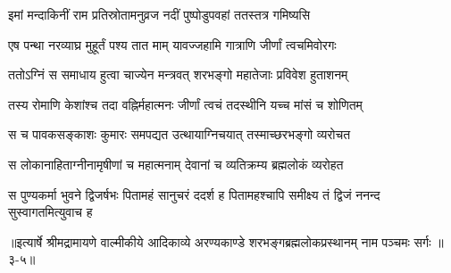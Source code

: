 \twolineshloka
{इमां मन्दाकिनीं राम प्रतिस्रोतामनुव्रज}
{नदीं पुष्पोडुपवहां ततस्तत्र गमिष्यसि} %

\twolineshloka
{एष पन्था नरव्याघ्र मुहूर्तं पश्य तात माम्}
{यावज्जहामि गात्राणि जीर्णां त्वचमिवोरगः} %

\twolineshloka
{ततोऽग्निं स समाधाय हुत्वा चाज्येन मन्त्रवत्}
{शरभङ्गो महातेजाः प्रविवेश हुताशनम्} %

\twolineshloka
{तस्य रोमाणि केशांश्च तदा वह्निर्महात्मनः}
{जीर्णां त्वचं तदस्थीनि यच्च मांसं च शोणितम्} %

\twolineshloka
{स च पावकसङ्काशः कुमारः समपद्यत}
{उत्थायाग्निचयात् तस्माच्छरभङ्गो व्यरोचत} %

\twolineshloka
{स लोकानाहिताग्नीनामृषीणां च महात्मनाम्}
{देवानां च व्यतिक्रम्य ब्रह्मलोकं व्यरोहत} %

\twolineshloka
{स पुण्यकर्मा भुवने द्विजर्षभः पितामहं सानुचरं ददर्श ह}
{पितामहश्चापि समीक्ष्य तं द्विजं ननन्द सुस्वागतमित्युवाच ह} %


॥इत्यार्षे श्रीमद्रामायणे वाल्मीकीये आदिकाव्ये अरण्यकाण्डे शरभङ्गब्रह्मलोकप्रस्थानम् नाम पञ्चमः सर्गः ॥३-५॥

